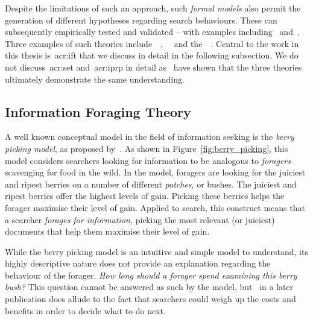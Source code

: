 Despite the limitations of such an approach, such \emph{formal models} also permit the generation of different hypotheses regarding search behaviours. These can subsequently empirically tested and validated -- with examples including~\cite{azzopardi2013query_cost} and~\cite{pirolli1996scatter_techniques}. Three examples of such theories include~~\citep{pirolli1999ift},~~\citep{azzopardi2011economics} and the~~\citep{fuhr2008iprp}. Central to the work in this thesis is~\gls{acr:ift} that we discuss in detail in the following subsection. We do not discuss~\gls{acr:set} and~\gls{acr:iprp} in detail as~\cite{azzopardi2015theories} have shown that the three theories ultimately demonstrate the same understanding.


\subsection{Information Foraging Theory}\label{sec:stopping_background:theoretical:ift}
A well known conceptual model in the field of information seeking is the \emph{berry picking model}, as proposed by~\cite{bates1989berry_picking}. As shown in Figure~\ref{fig:berry_picking}, this model considers searchers looking for information to be analogous to \emph{foragers} scavenging for food in the wild. In the model, foragers are looking for the juiciest and ripest berries on a number of different \emph{patches}, or bushes. The juiciest and ripest berries offer the highest levels of gain. Picking these berries helps the forager maximise their level of gain. Applied to search, this construct means that a searcher \emph{forages for information,} picking the most relevant (or juiciest) documents that help them maximise their level of gain.

While the berry picking model is an intuitive and simple model to understand, its highly descriptive nature does not provide an explanation regarding the behaviour of the forager. \emph{How long should a forager spend examining this berry bush?} This question cannot be answered as such by the model, but~\cite{bates1989alluding} in a later publication does allude to the fact that searchers could weigh up the costs and benefits in order to decide what to do next.

